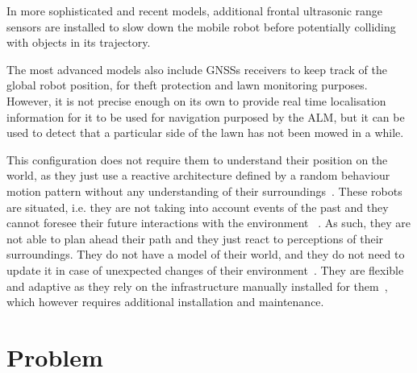 In more sophisticated and recent models, additional frontal ultrasonic range sensors are installed to slow down the mobile robot before potentially colliding with objects in its trajectory.

The most advanced models also include \Glspl{GNSS} receivers to keep track of the global robot position, for theft protection and lawn monitoring purposes.
However, it is not precise enough on its own to provide real time localisation information for it to be used for navigation purposed by the \gls{ALM}, but it can be used to detect that a particular side of the lawn has not been mowed in a while.%

This configuration does not require them to understand their position on the world, as they just use a reactive architecture defined by a random behaviour motion pattern without any understanding of their surroundings~\cite{wooldridge_agent_1995}.
These robots are situated, i.e. they are not taking into account events of the past and they cannot foresee their future interactions with the environment  ~\cite{muller_1999}.
As such, they are not able to plan ahead their path and they just react to perceptions of their surroundings.
They do not have a model of their world, and they do not need to update it in case of unexpected changes of their environment~\cite{wooldridge_agent_1995}.
They are flexible and adaptive as they rely on the infrastructure manually installed for them~\cite{wahde2012introduction},  which however requires additional installation and maintenance.



\noindent 


\section{Problem}

